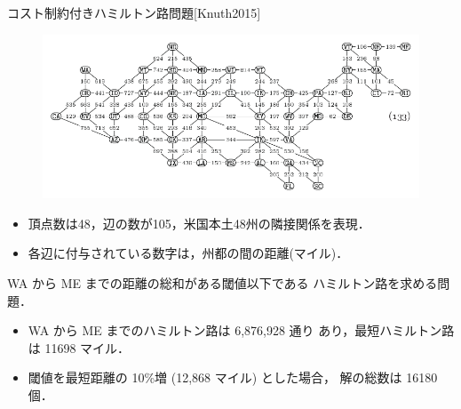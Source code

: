 \documentclass[dvipdfmx,10pt]{beamer}
\begin{document}
\begin{frame}{コスト制約付きハミルトン路問題[Knuth2015]}
  \begin{figure}[tb]
  \centering
  \includegraphics[width=0.8\linewidth]{fig/taocp_vol4fasc1b_p52_eq133.pdf}
  \end{figure}

  \begin{itemize}  
  \item 頂点数は48，辺の数が105，米国本土48州の隣接関係を表現．
  \item 各辺に付与されている数字は，州都の間の距離(マイル)．
  \end{itemize}
  \begin{block}{}
    WA から ME までの距離の総和がある閾値以下である
    ハミルトン路を求める問題．
  \end{block}
  \begin{itemize}
  \item WA から ME までのハミルトン路は 6,876,928 通り
    あり，最短ハミルトン路は 11698 マイル．
  \item 閾値を最短距離の 10\%増 (12,868 マイル) とした場合，
    解の総数は 16180 個．
  \end{itemize}
\end{frame}
\end{document}

